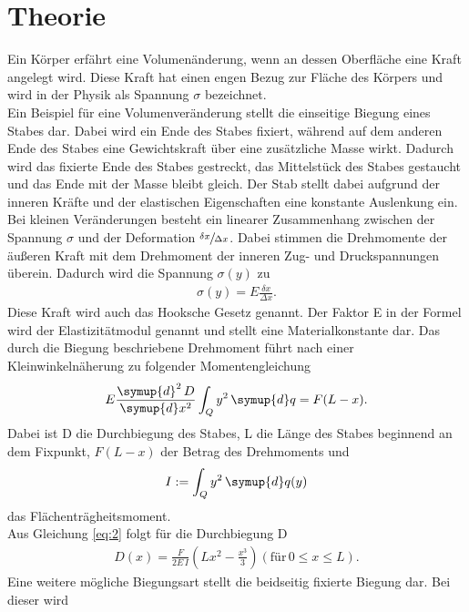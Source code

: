 \section{Theorie}\label{sec:1}\justifying
Ein Körper erfährt eine Volumenänderung, wenn an dessen Oberfläche eine Kraft angelegt
wird. Diese Kraft hat einen engen Bezug zur Fläche des Körpers und wird in der Physik
als Spannung $\sigma$ bezeichnet.\\
Ein Beispiel für eine Volumenveränderung stellt die einseitige Biegung eines Stabes dar.
Dabei wird ein Ende des Stabes fixiert, während auf dem anderen Ende des Stabes eine
Gewichtskraft über eine zusätzliche Masse wirkt. Dadurch wird das fixierte Ende des Stabes gestreckt,
das Mittelstück des Stabes gestaucht und das Ende mit der Masse bleibt gleich. Der Stab stellt dabei aufgrund der inneren
Kräfte und der elastischen Eigenschaften eine konstante Auslenkung ein.
Bei kleinen Veränderungen
besteht ein linearer Zusammenhang zwischen der Spannung $\sigma$  und der Deformation $\sfrac{\delta x}{\Delta x} $.
Dabei stimmen die Drehmomente der äußeren Kraft mit dem Drehmoment der inneren Zug- und Druckspannungen
überein. Dadurch wird die Spannung $\sigma(y)$ zu \cite{V103}
\begin{align}
    \sigma (y)=E \frac{\delta x}{\Delta x} \label{eq:1}.
\end{align}
Diese Kraft wird auch das Hooksche Gesetz genannt. Der Faktor E in der Formel wird
der Elastizitätmodul genannt und stellt eine Materialkonstante dar.
Das durch die Biegung beschriebene Drehmoment führt nach einer Kleinwinkelnäherung zu folgender Momentengleichung \cite{V103}
\begin{align}
    E \frac{\symup{d}^2 \, D}{\symup{d}x^2}\int_Q y^2 \, \symup{d}q = F(L-x) .\label{eq:2}
\end{align}
Dabei ist D die Durchbiegung des Stabes, L die Länge des Stabes beginnend an dem Fixpunkt, $F(L-x)$ der Betrag des Drehmoments und \cite{V103}
\begin{align}
    I := \int_Q y^2 \, \symup{d}q(y) \label{eq:3}
\end{align}
das Flächenträgheitsmoment. \\
Aus Gleichung \eqref{eq:2} folgt für die Durchbiegung D \cite{V103}
\begin{align}
    D(x)=\frac{F}{2E\,I}\left(L  x^2-\frac{x^3}{3}\right) \label{eq:4} (\text{für} \, 0\leq x \leq L).
\end{align}
Eine weitere mögliche Biegungsart stellt die beidseitig fixierte Biegung dar. Bei dieser wird
